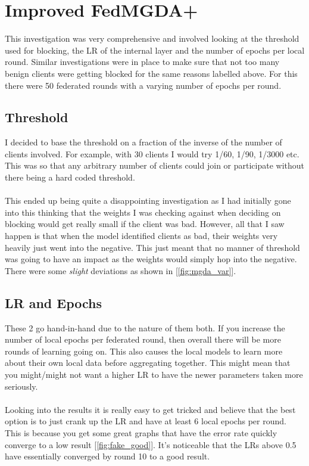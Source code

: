 \section{Improved FedMGDA+}
This investigation was very comprehensive and involved looking at the threshold used for blocking, the LR of the internal layer and the number of epochs per local round. 
Similar investigations were in place to make sure that not too many benign clients were getting blocked for the same reasons labelled above.
For this there were 50 federated rounds with a varying number of epochs per round.

\subsection{Threshold}
I decided to base the threshold on a fraction of the inverse of the number of clients involved.
For example, with 30 clients I would try 1/60, 1/90, 1/3000 etc.
This was so that any arbitrary number of clients could join or participate without there being a hard coded threshold.
\\ \\
This ended up being quite a disappointing investigation as I had initially gone into this thinking that the weights I was checking against when deciding on blocking would get really small if the client was bad. 
However, all that I saw happen is that when the model identified clients as bad, their weights very heavily just went into the negative.
This just meant that no manner of threshold was going to have an impact as the weights would simply hop into the negative.
There were some \textit{slight} deviations as shown in [\ref{fig:mgda_var}].

\subsection{LR and Epochs}
These 2 go hand-in-hand due to the nature of them both. 
If you increase the number of local epochs per federated round, then overall there will be more rounds of learning going on. 
This also causes the local models to learn more about their own local data before aggregating together. 
This might mean that you might/might not want a higher LR to have the newer parameters taken more seriously.
\\ \\
Looking into the results it is really easy to get tricked and believe that the best option is to just crank up the LR and have at least 6 local epochs per round. 
This is because you get some great graphs that have the error rate quickly converge to a low result [\ref{fig:fake_good}].
It's noticeable that the LRs above 0.5 have essentially converged by round 10 to a good result.

